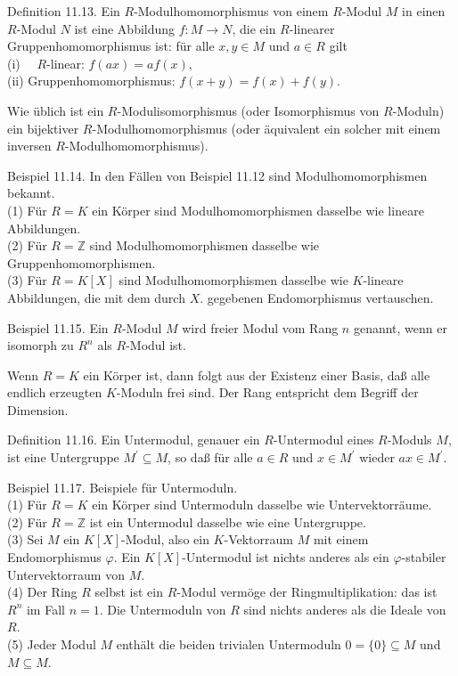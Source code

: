 \documentclass[10pt, letterpaper]{article}
\begin{document}
Definition 11.13. Ein $R$-Modulhomomorphismus von einem $R$-Modul $M$ in einen $R$-Modul $N$ ist eine Abbildung $f: M \rightarrow N$, die ein $R$-linearer Gruppenhomomorphismus ist: für alle $x, y \in M$ und $a \in R$ gilt\\
(i) $\quad R$-linear: $f(a x)=a f(x)$,\\
(ii) Gruppenhomomorphismus: $f(x+y)=f(x)+f(y)$.

Wie üblich ist ein $R$-Modulisomorphismus (oder Isomorphismus von $R$-Moduln) ein bijektiver $R$-Modulhomomorphismus (oder äquivalent ein solcher mit einem inversen $R$-Modulhomomorphismus).

Beispiel 11.14. In den Fällen von Beispiel 11.12 sind Modulhomomorphismen bekannt.\\
(1) Für $R=K$ ein Körper sind Modulhomomorphismen dasselbe wie lineare Abbildungen.\\
(2) Für $R=\mathbb{Z}$ sind Modulhomomorphismen dasselbe wie Gruppenhomomorphismen.\\
(3) Für $R=K[X]$ sind Modulhomomorphismen dasselbe wie $K$-lineare Abbildungen, die mit dem durch $X$. gegebenen Endomorphismus vertauschen.

Beispiel 11.15. Ein $R$-Modul $M$ wird freier Modul vom Rang $n$ genannt, wenn er isomorph zu $R^{n}$ als $R$-Modul ist.

Wenn $R=K$ ein Körper ist, dann folgt aus der Existenz einer Basis, daß alle endlich erzeugten $K$-Moduln frei sind. Der Rang entspricht dem Begriff der Dimension.

Definition 11.16. Ein Untermodul, genauer ein $R$-Untermodul eines $R$-Moduls $M$, ist eine Untergruppe $M^{\prime} \subseteq M$, so daß für alle $a \in R$ und $x \in M^{\prime}$ wieder $a x \in M^{\prime}$.

Beispiel 11.17. Beispiele für Untermoduln.\\
(1) Für $R=K$ ein Körper sind Untermoduln dasselbe wie Untervektorräume.\\
(2) Für $R=\mathbb{Z}$ ist ein Untermodul dasselbe wie eine Untergruppe.\\
(3) Sei $M$ ein $K[X]$-Modul, also ein $K$-Vektorraum $M$ mit einem Endomorphismus $\varphi$. Ein $K[X]$-Untermodul ist nichts anderes als ein $\varphi$-stabiler Untervektorraum von $M$.\\
(4) Der Ring $R$ selbst ist ein $R$-Modul vermöge der Ringmultiplikation: das ist $R^{n}$ im Fall $n=1$. Die Untermoduln von $R$ sind nichts anderes als die Ideale von $R$.\\
(5) Jeder Modul $M$ enthält die beiden trivialen Untermoduln $0=\{0\} \subseteq M$ und $M \subseteq M$.
\end{document}
